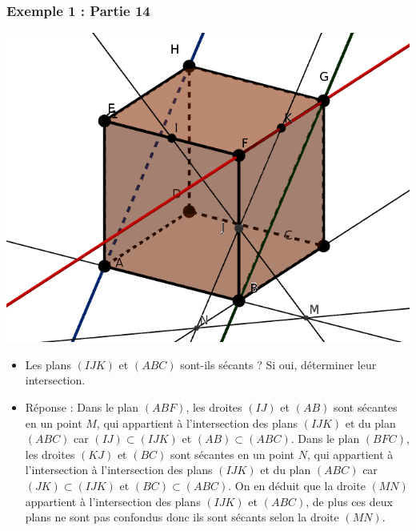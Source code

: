 \documentclass[xcolor=svgnames,t,final]{beamer}
\begin{document}
\begin{frame}

\frametitle{Exemple 1 : Partie 14}


\begin{center}
\includegraphics[scale=0.1]{images/exemple1-intersection.png}
\end{center}

\begin{itemize}
\pause \item {\color{blue}   Les plans $(IJK)$ et $(ABC)$ sont-ils sécants ? Si oui, déterminer leur intersection.}
\pause \item {\color{red} Réponse : Dans le plan $(ABF)$, les droites $(IJ)$ et $(AB)$ sont sécantes en un point $M$, qui appartient à l'intersection des plans $(IJK)$ et du plan $(ABC)$ car $(IJ) \subset (IJK)$ et $(AB) \subset (ABC)$. Dans le plan $(BFC)$, les droites $(KJ)$ et $(BC)$ sont sécantes en un point $N$, qui appartient à l'intersection à l'intersection des plans $(IJK)$ et du plan $(ABC)$ car $(JK) \subset (IJK)$ et $(BC) \subset (ABC)$. On en déduit que la droite $(MN)$ appartient à l'intersection des plans $(IJK)$ et $(ABC)$, de plus ces deux plans ne sont pas confondus donc ils sont sécants selon la droite $(MN)$.
}
\end{itemize}


\end{frame}
\end{document}
